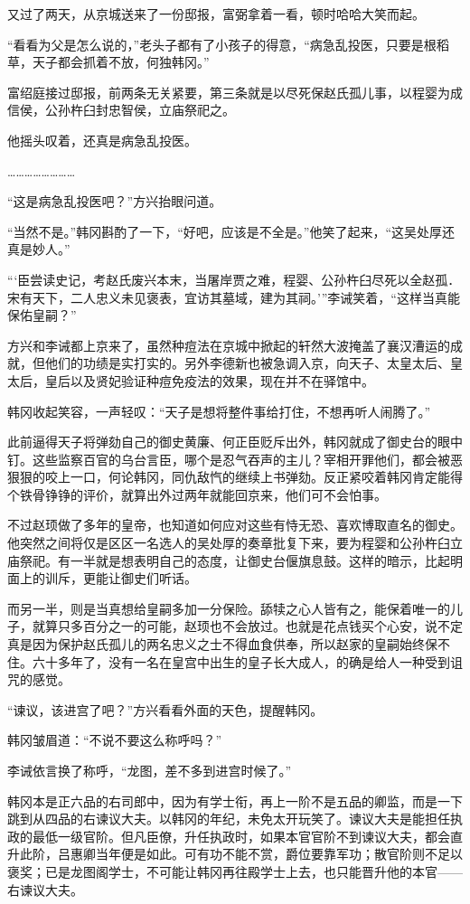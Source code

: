 又过了两天，从京城送来了一份邸报，富弼拿着一看，顿时哈哈大笑而起。

“看看为父是怎么说的，”老头子都有了小孩子的得意，“病急乱投医，只要是根稻草，天子都会抓着不放，何独韩冈。”

富绍庭接过邸报，前两条无关紧要，第三条就是以尽死保赵氏孤儿事，以程婴为成信侯，公孙杵臼封忠智侯，立庙祭祀之。

他摇头叹着，还真是病急乱投医。

……………………

“这是病急乱投医吧？”方兴抬眼问道。

“当然不是。”韩冈斟酌了一下，“好吧，应该是不全是。”他笑了起来，“这吴处厚还真是妙人。”

“‘臣尝读史记，考赵氏废兴本末，当屠岸贾之难，程婴、公孙杵臼尽死以全赵孤．宋有天下，二人忠义未见褒表，宜访其墓域，建为其祠。’”李诫笑着，“这样当真能保佑皇嗣？”

方兴和李诫都上京来了，虽然种痘法在京城中掀起的轩然大波掩盖了襄汉漕运的成就，但他们的功绩是实打实的。另外李德新也被急调入京，向天子、太皇太后、皇太后，皇后以及贤妃验证种痘免疫法的效果，现在并不在驿馆中。

韩冈收起笑容，一声轻叹：“天子是想将整件事给打住，不想再听人闹腾了。”

此前逼得天子将弹劾自己的御史黄廉、何正臣贬斥出外，韩冈就成了御史台的眼中钉。这些监察百官的乌台言臣，哪个是忍气吞声的主儿？宰相开罪他们，都会被恶狠狠的咬上一口，何论韩冈，同仇敌忾的继续上书弹劾。反正紧咬着韩冈肯定能得个铁骨铮铮的评价，就算出外过两年就能回京来，他们可不会怕事。

不过赵顼做了多年的皇帝，也知道如何应对这些有恃无恐、喜欢博取直名的御史。他突然之间将仅是区区一名选人的吴处厚的奏章批复下来，要为程婴和公孙杵臼立庙祭祀。有一半就是想表明自己的态度，让御史台偃旗息鼓。这样的暗示，比起明面上的训斥，更能让御史们听话。

而另一半，则是当真想给皇嗣多加一分保险。舔犊之心人皆有之，能保着唯一的儿子，就算只多百分之一的可能，赵顼也不会放过。也就是花点钱买个心安，说不定真是因为保护赵氏孤儿的两名忠义之士不得血食供奉，所以赵家的皇嗣始终保不住。六十多年了，没有一名在皇宫中出生的皇子长大成人，的确是给人一种受到诅咒的感觉。

“谏议，该进宫了吧？”方兴看看外面的天色，提醒韩冈。

韩冈皱眉道：“不说不要这么称呼吗？”

李诫依言换了称呼，“龙图，差不多到进宫时候了。”

韩冈本是正六品的右司郎中，因为有学士衔，再上一阶不是五品的卿监，而是一下跳到从四品的右谏议大夫。以韩冈的年纪，未免太开玩笑了。谏议大夫是能担任执政的最低一级官阶。但凡臣僚，升任执政时，如果本官官阶不到谏议大夫，都会直升此阶，吕惠卿当年便是如此。可有功不能不赏，爵位要靠军功；散官阶则不足以褒奖；已是龙图阁学士，不可能让韩冈再往殿学士上去，也只能晋升他的本官——右谏议大夫。

